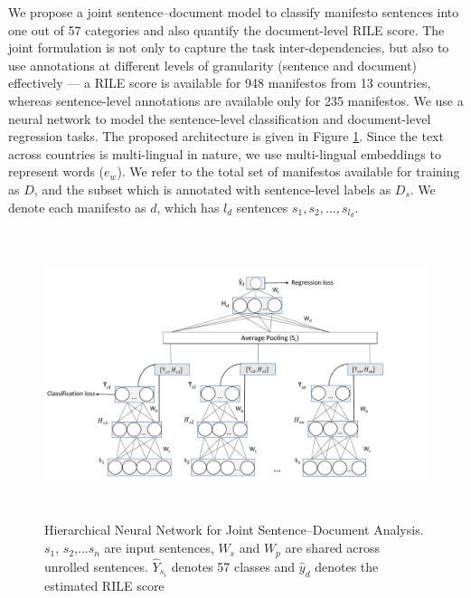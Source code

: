\documentclass[11pt,a4paper]{article}
\begin{document}
We propose a joint sentence--document model to classify manifesto sentences into one out of 57 categories and also quantify the document-level RILE score. The joint formulation is not only to capture the task inter-dependencies, but also to use annotations at different levels of granularity (sentence and document) effectively --- a RILE score is available for 948 manifestos from 13 countries, whereas sentence-level annotations are available only for 235 manifestos. We use a neural network to model the sentence-level classification and document-level regression tasks. The proposed architecture is given in Figure \ref{fig:HNN}. Since the text across countries is multi-lingual in nature, we use multi-lingual embeddings to represent words ($e_{w}$). We refer to the total set of manifestos available for training as $D$, and the subset which is annotated with sentence-level labels as $D_{s}$. We denote each manifesto as $d$, which has $l_{d}$ sentences $s_{1}, s_{2}, ..., s_{l_{d}}$. 


\begin{figure}[!t]
\centering
\includegraphics[height=8.4cm, scale=1.4]{ALTA_Model.pdf}
\caption{Hierarchical Neural Network for Joint Sentence--Document Analysis. $s_{1}$, $s_{2}$,...$s_{n}$ are input sentences, $W_{s}$ and $W_{p}$ are shared across unrolled sentences. $\hat{Y}_{s_{i}}$ denotes  57 classes and $\hat{y}_{d}$ denotes the estimated RILE score}
 \label{fig:HNN}
 \end{figure}
\end{document}
